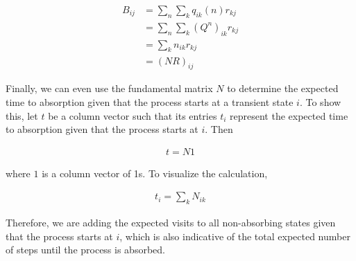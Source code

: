 \documentclass[a4paper,12pt]{article}
\theoremstyle{definition}
\begin{document}
	\begin{equation*}
		\begin{aligned}
		 B_{ij} &= \sum_{n} \sum_{k} q_{ik}(n)r_{kj} \\
		 		&= \sum_{n} \sum_{k} (Q^n)_{ik} r_{kj} \\
		 		&= \sum_{k} n_{ik}r_{kj} \\
		 		&= (NR)_{ij}
		\end{aligned}
	\end{equation*}

	Finally, we can even use the fundamental matrix $N$ to determine the expected time to absorption given that the process starts at a 
	transient state $i$. To show this, let $t$ be a column vector such that its entries $t_i$ represent the expected time to 
	absorption given that the process starts at $i$. Then

	\begin{equation*}
	\begin{aligned}
		 t = N1
	\end{aligned}
	\end{equation*}
	
	where $1$ is a column vector of 1s. To visualize the calculation,

	\begin{equation*}
		\begin{aligned}
		 t_i = \sum_{k} N_{ik}
		\end{aligned}
	\end{equation*}
	
	Therefore, we are adding the expected visits to all non-absorbing states given that the process starts at $i$, which 
	is also indicative of the total expected number of steps until the process is absorbed.
\end{document}
